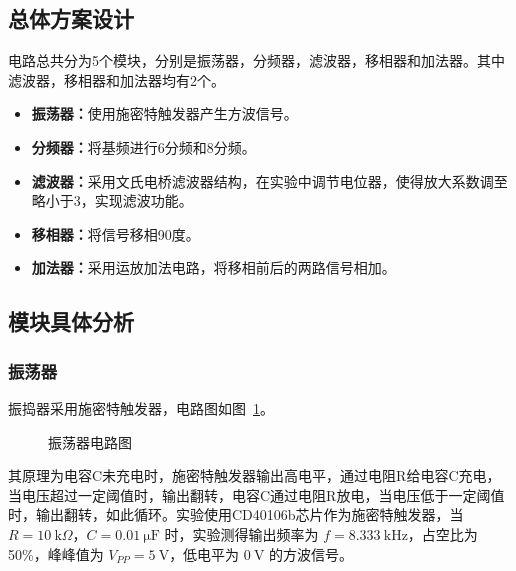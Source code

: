 \documentclass[utf8,twocolumn]{article}
\begin{document}
\subsection{总体方案设计}
电路总共分为5个模块，分别是振荡器，分频器，滤波器，移相器和加法器。其中滤波器，移相器和加法器均有2个。
\begin{itemize}
    \item \textbf{振荡器：}使用施密特触发器产生方波信号。
    \item \textbf{分频器：}将基频进行6分频和8分频。
    \item \textbf{滤波器：}采用文氏电桥滤波器结构，在实验中调节电位器，使得放大系数调至略小于3，实现滤波功能。
    \item \textbf{移相器：}将信号移相90度。
    \item \textbf{加法器：}采用运放加法电路，将移相前后的两路信号相加。
\end{itemize}


\subsection{模块具体分析}
\subsubsection{振荡器}
振捣器采用施密特触发器，电路图如图~\ref{circ:oscillator}。
\begin{figure}[H]
    \centering
    \scalebox{0.8}{
        
    }
    \caption{振荡器电路图}
    \label{circ:oscillator}
\end{figure}
其原理为电容C未充电时，施密特触发器输出高电平，通过电阻R给电容C充电，当电压超过一定阈值时，输出翻转，电容C通过电阻R放电，当电压低于一定阈值时，输出翻转，如此循环。实验使用CD40106b芯片作为施密特触发器，当 $ R = 10~\mathrm{k}\Omega $，$ C = 0.01~\mathrm{\mu F} $ 时，实验测得输出频率为 $ f = 8.333~\mathrm{kHz} $，占空比为50\%，峰峰值为 $ V_{PP} = 5~\mathrm{V} $，低电平为 $ 0~\mathrm{V} $ 的方波信号。
\end{document}
